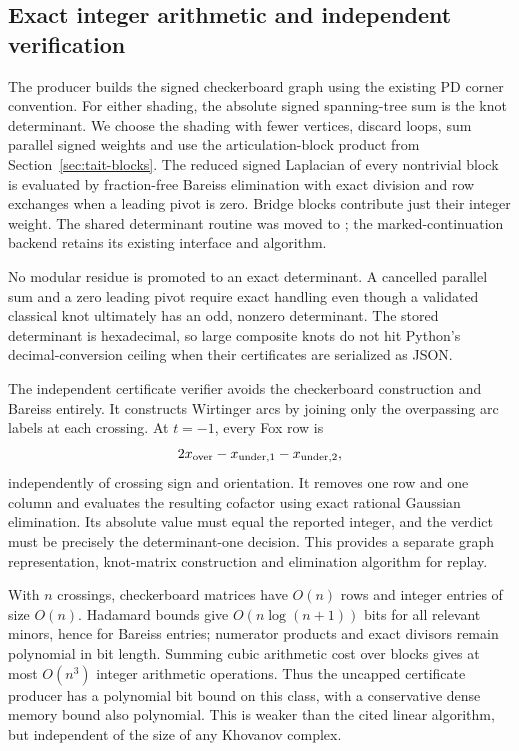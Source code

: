 \subsection{Exact integer arithmetic and independent verification}

The producer builds the signed checkerboard graph using the existing
PD corner convention.  For either shading, the absolute signed
spanning-tree sum is the knot determinant.  We choose the shading with
fewer vertices, discard loops, sum parallel signed weights and use the
articulation-block product from Section~\ref{sec:tait-blocks}.
The reduced signed Laplacian of every nontrivial block is evaluated by
fraction-free Bareiss elimination with exact division and row exchanges
when a leading pivot is zero.  Bridge blocks contribute just their integer
weight.  The shared determinant routine was moved to
; the marked-continuation backend retains its
existing interface and algorithm.

No modular residue is promoted to an exact determinant.  A cancelled
parallel sum and a zero leading pivot require exact handling even though a
validated classical knot ultimately has an odd, nonzero determinant.
The stored determinant is hexadecimal, so large composite knots do not
hit Python's decimal-conversion ceiling when their certificates are
serialized as JSON.

The independent certificate verifier avoids the checkerboard construction
and Bareiss entirely.  It constructs Wirtinger arcs by joining only the
overpassing arc labels at each crossing.  At $t=-1$, every Fox row is
\[
 2x_{\rm over}-x_{\rm under,1}-x_{\rm under,2},
\]
independently of crossing sign and orientation.  It removes one row and
one column and evaluates the resulting cofactor using exact rational
Gaussian elimination.  Its absolute value must equal the reported
integer, and the verdict must be precisely the determinant-one decision.
This provides a separate graph representation, knot-matrix construction
and elimination algorithm for replay.

With $n$ crossings, checkerboard matrices have $O(n)$ rows and integer
entries of size $O(n)$.  Hadamard bounds give $O(n\log(n+1))$ bits for
all relevant minors, hence for Bareiss entries; numerator products and
exact divisors remain polynomial in bit length.  Summing cubic arithmetic
cost over blocks gives at most $O(n^3)$ integer arithmetic operations.
Thus the uncapped certificate producer has a polynomial bit bound on this
class, with a conservative dense memory bound also polynomial.  This is
weaker than the cited linear algorithm, but independent of the size of any
Khovanov complex.

